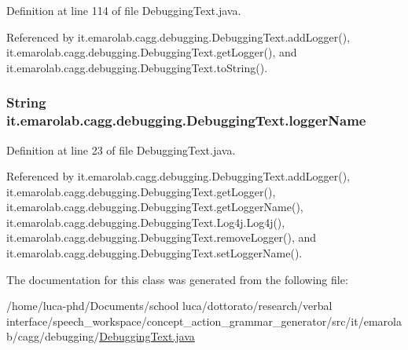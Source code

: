 Definition at line 114 of file Debugging\-Text.\-java.



Referenced by it.\-emarolab.\-cagg.\-debugging.\-Debugging\-Text.\-add\-Logger(), it.\-emarolab.\-cagg.\-debugging.\-Debugging\-Text.\-get\-Logger(), and it.\-emarolab.\-cagg.\-debugging.\-Debugging\-Text.\-to\-String().

\hypertarget{classit_1_1emarolab_1_1cagg_1_1debugging_1_1DebuggingText_afa1175bdb0c7a658affe0b25a8a924c3}{
\subsubsection[{logger\-Name}]{\setlength{\rightskip}{0pt plus 5cm}String it.\-emarolab.\-cagg.\-debugging.\-Debugging\-Text.\-logger\-Name\hspace{0.3cm}{\ttfamily [private]}}}\label{classit_1_1emarolab_1_1cagg_1_1debugging_1_1DebuggingText_afa1175bdb0c7a658affe0b25a8a924c3}


Definition at line 23 of file Debugging\-Text.\-java.



Referenced by it.\-emarolab.\-cagg.\-debugging.\-Debugging\-Text.\-add\-Logger(), it.\-emarolab.\-cagg.\-debugging.\-Debugging\-Text.\-get\-Logger(), it.\-emarolab.\-cagg.\-debugging.\-Debugging\-Text.\-get\-Logger\-Name(), it.\-emarolab.\-cagg.\-debugging.\-Debugging\-Text.\-Log4j.\-Log4j(), it.\-emarolab.\-cagg.\-debugging.\-Debugging\-Text.\-remove\-Logger(), and it.\-emarolab.\-cagg.\-debugging.\-Debugging\-Text.\-set\-Logger\-Name().



The documentation for this class was generated from the following file\-:\begin{DoxyCompactItemize}
\item 
/home/luca-\/phd/\-Documents/school luca/dottorato/research/verbal interface/speech\-\_\-workspace/concept\-\_\-action\-\_\-grammar\-\_\-generator/src/it/emarolab/cagg/debugging/\hyperlink{DebuggingText_8java}{Debugging\-Text.\-java}\end{DoxyCompactItemize}
